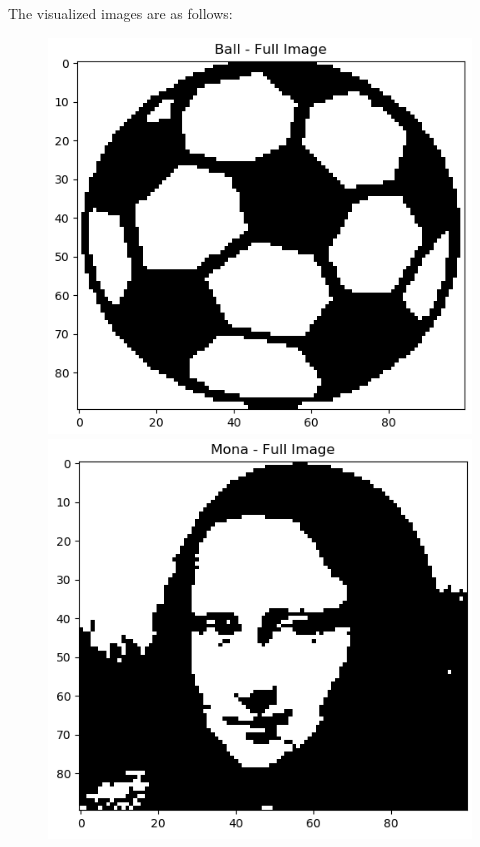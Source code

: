 \documentclass[12pt,a4paper]{article}
\newcommand{\noi}{\noindent}
\begin{document}
\noi
The visualized images are as follows:
\begin{figure}[H]
\includegraphics[scale=0.3]{images/ball.png}
\includegraphics[scale=0.3]{images/mona.png}

\end{figure}
\end{document}
